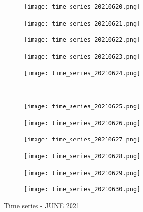 \documentclass[10pt]{article}
\begin{document}
\begin{figure}[!h]
\begin{subfigure}[b]{0.166\linewidth}
        \centering
        \texttt{[image: time\_series\_20210620.png]}
    \end{subfigure}%
    \begin{subfigure}[b]{0.166\linewidth}
        \centering
        \texttt{[image: time\_series\_20210621.png]}
    \end{subfigure}%
        \begin{subfigure}[b]{0.166\linewidth}
        \centering
        \texttt{[image: time\_series\_20210622.png]}
    \end{subfigure}%
    \begin{subfigure}[b]{0.166\linewidth}
        \centering
        \texttt{[image: time\_series\_20210623.png]}
    \end{subfigure}%
    \begin{subfigure}[b]{0.166\linewidth}
        \centering
        \texttt{[image: time\_series\_20210624.png]}
    \end{subfigure}
    \\
    \begin{subfigure}[b]{0.166\linewidth}
        \centering
        \texttt{[image: time\_series\_20210625.png]}
    \end{subfigure}%
    \begin{subfigure}[b]{0.166\linewidth}
        \centering
        \texttt{[image: time\_series\_20210626.png]}
    \end{subfigure}%
        \begin{subfigure}[b]{0.166\linewidth}
        \centering
        \texttt{[image: time\_series\_20210627.png]}
    \end{subfigure}%
    \begin{subfigure}[b]{0.166\linewidth}
        \centering
        \texttt{[image: time\_series\_20210628.png]}
    \end{subfigure}%
    \begin{subfigure}[b]{0.166\linewidth}
        \centering
        \texttt{[image: time\_series\_20210629.png]}
    \end{subfigure}%
    \begin{subfigure}[b]{0.166\linewidth}
        \centering
        \texttt{[image: time\_series\_20210630.png]}
    \end{subfigure}
     \caption{Time series - JUNE 2021}
\label{fig:bands}
\end{figure}
\end{document}
